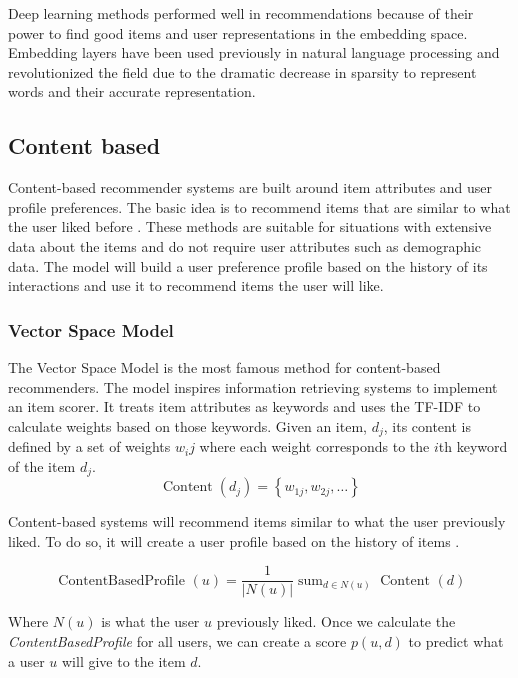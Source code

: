 \documentclass{kththesis}
\begin{document}
Deep learning methods performed well in recommendations because of their power to find good items and user representations in the embedding space. Embedding layers have been used previously in natural language processing and revolutionized the field due to the dramatic decrease in sparsity to represent words and their accurate representation. 

\subsection{Content based}
Content-based recommender systems are built around item attributes and user profile preferences. The basic idea is to recommend items that are similar to what the user liked before \cite{contentbased}. These methods are suitable for situations with extensive data about the items and do not require user attributes such as demographic data. The model will build a user preference profile based on the history of its interactions and use it to recommend items the user will like.

\subsubsection{Vector Space Model}
The Vector Space Model \cite{vectorspacemodel} is the most famous method for content-based recommenders. The model inspires information retrieving systems to implement an item scorer. It treats item attributes as keywords and uses the TF-IDF \cite{tfidf} to calculate weights based on those keywords. Given an item, $d_j$, its content is defined by a set of weights $w_ij$ where each weight corresponds to the $i$th keyword of the item $d_j$.
\begin{equation}
\operatorname{Content}\left(d_{j}\right)=\left\{w_{1 j}, w_{2 j}, \ldots\right\}
\end{equation}

Content-based systems will recommend items similar to what the user previously liked. To do so, it will create a user profile based on the history of items \cite{contentprofile}.

\begin{equation}
\text { ContentBasedProfile }(u)=\frac{1}{|N(u)|} \operatorname{sum}_{d \in N(u)} \text { Content }(d)
\end{equation}

Where $N(u)$ is what the user $u$ previously liked. Once we calculate the \textit{ContentBasedProfile} for all users, we can create a score $p(u,d)$ to predict what a user $u$ will give to the item $d$.
\end{document}
